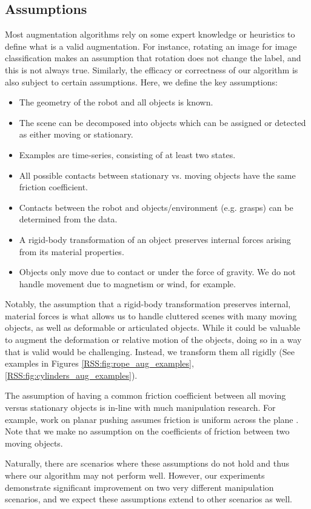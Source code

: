 \subsection{Assumptions}
\label{RSS:sec:assumptions}

Most augmentation algorithms rely on some expert knowledge or heuristics to define what is a valid augmentation. For instance, rotating an image for image classification makes an assumption that rotation does not change the label, and this is not always true. Similarly, the efficacy or correctness of our algorithm is also subject to certain assumptions. Here, we define the key assumptions:

\begin{itemize}
    \item The geometry of the robot and all objects is known.
    \item The scene can be decomposed into objects which can be assigned or detected as either moving or stationary.
    \item Examples are time-series, consisting of at least two states.
    \item All possible contacts between stationary vs. moving objects have the same friction coefficient.
    \item Contacts between the robot and objects/environment (e.g. grasps) can be determined from the data.
    \item A rigid-body transformation of an object preserves internal forces arising from its material properties.
    \item Objects only move due to contact or under the force of gravity. We do not handle movement due to magnetism or wind, for example.
\end{itemize}

Notably, the assumption that a rigid-body transformation preserves internal, material forces is what allows us to handle cluttered scenes with many moving objects, as well as deformable or articulated objects. While it could be valuable to augment the deformation or relative motion of the objects, doing so in a way that is valid would be challenging. Instead, we transform them all rigidly (See examples in Figures \ref{RSS:fig:rope_aug_examples},\ref{RSS:fig:cylinders_aug_examples}).

The assumption of having a common friction coefficient between all moving versus stationary objects is in-line with much manipulation research. For example, work on planar pushing assumes friction is uniform across the plane \cite{PushSim2021,PushYu2016}. Note that we make no assumption on the coefficients of friction between two moving objects.

Naturally, there are scenarios where these assumptions do not hold and thus where our algorithm may not perform well. However, our experiments demonstrate significant improvement on two very different manipulation scenarios, and we expect these assumptions extend to other scenarios as well.